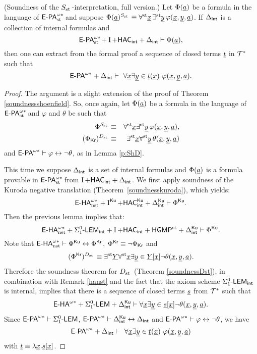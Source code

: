 \begin{thm} {\rm (Soundness of the $\Sh$-interpretation, full version.)}\label{fullsoundnessSst} Let $\Phi(\tup a)$ be a formula in the language of $\epaststar$ and suppose $\Phi(\tup a)^\Sh\equiv\forallst \tup x \, \existsst \tup y \, \phi(\tup x, \tup y, \tup a)$. If $\Delta_{\intern}$ is a collection of internal formulas and
\[ \epaststar + \I + \HAC_\intern + \Delta_{\intern} \vdash \Phi(\tup a), \]
then one can extract from the formal proof a sequence of closed terms $\tup t$ in $\Tstar$ such that
\[
\epastar + \Delta_{\intern} \vdash\ \forall \tup x\exists \tup y\in \tup t(\tup x)\ \phi(\tup x,\tup y, \tup a).
\]
\end{thm}
\begin{proof} The argument is a slight extension of the proof of Theorem \ref{soundnessshoenfield}. So, once again, let $\Phi(\tup a)$ be a formula in the language of $\epaststar$ and $\varphi$ and $\theta$ be such that
\begin{eqnarray*}
\Phi^\Sh & \equiv & \forallst \tup x\existsst  \tup y \, \phi(\tup x, \tup y, \tup a), \\
(\Phi_\kr)^\D & \equiv & \existsst \tup x \forallst \tup y \, \theta(\tup x,\tup y, \tup a)
\end{eqnarray*}
and $\epastar \vdash \varphi \leftrightarrow \lnot\theta$, as in Lemma \ref{p:ShD}.

This time we suppose $\Delta_\intern$ is a set of internal formulas and $\Phi(\tup a)$ is a formula provable in $\epaststar$ from $\I + \HAC_\intern + \Delta_\intern$. We first apply soundness of the Kuroda negative translation (Theorem~\ref{soundnesskuroda}), which yields:
\[ \ehanststar + \I^\ku + \HAC^\ku_\intern + \Delta_\intern^\ku \vdash \Phi^\ku. \]
Then the previous lemma implies that:
\[ \ehanststar + \LEM_\intern + \I + \HAC_\intern + \HGMP + \Delta_\intern^\ku \vdash \Phi^\ku. \]
Note that $\ehanststar \vdash \Phi^\ku \leftrightarrow \Phi^\kr$,  $\Phi^\kr \equiv \lnot \Phi_\kr$ and
\[ (\Phi^\kr)^\D \equiv \existsst \tup Y \forallst \tup x \exists \tup y \in \tup Y[\tup x] \lnot \theta(\tup x, \tup y , \tup a). \]
Therefore the soundness theorem for $\D$ (Theorem \ref{soundnessDst}), in combination with Remark \ref{hanst} and the fact that the axiom scheme $\LEM_\intern$ is internal, implies that there is a sequence of closed terms $\tup s$ from $\Tstar$ such that
\[ \ehastar + \LEM + \Delta_\intern^\ku \vdash \forall \tup x \exists \tup y \in \tup s[\tup x] \lnot \theta(\tup x, \tup y, \tup a). \]
Since $\epastar \vdash \LEM$, $\epastar \vdash \Delta_\intern^\ku \leftrightarrow \Delta_\intern$ and $\epastar \vdash \varphi \leftrightarrow \lnot \theta$, we have
\[
\epastar + \Delta_{\intern} \vdash\ \forall \tup x\exists \tup y \in \tup t(\tup x)\ \phi(\tup x,\tup y, \tup a)
\]
with $\tup t \equiv \lambda \tup x. \tup s[\tup x]$.
\end{proof}

